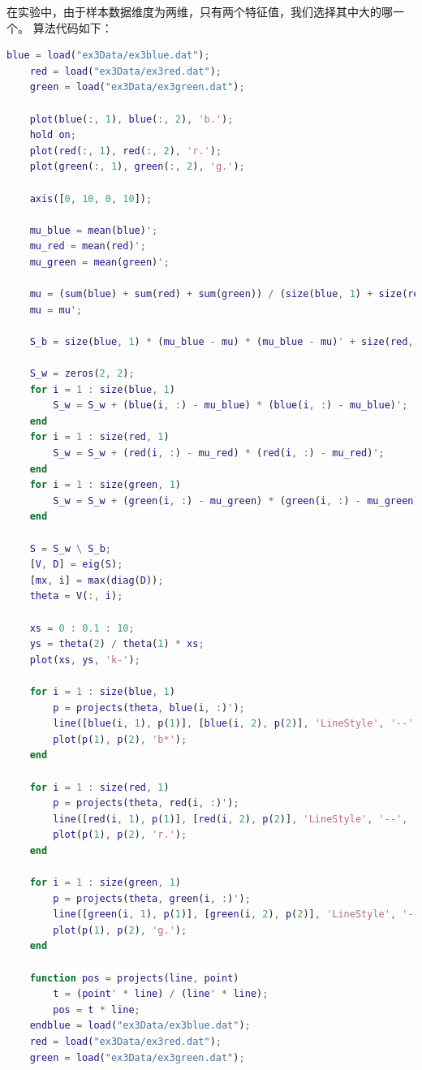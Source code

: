 \documentclass{article}
\begin{document}
在实验中，由于样本数据维度为两维，只有两个特征值，我们选择其中大的哪一个。
算法代码如下：
\begin{lstlisting}[language=matlab]
    blue = load("ex3Data/ex3blue.dat");
    red = load("ex3Data/ex3red.dat");
    green = load("ex3Data/ex3green.dat");

    plot(blue(:, 1), blue(:, 2), 'b.');
    hold on;
    plot(red(:, 1), red(:, 2), 'r.');
    plot(green(:, 1), green(:, 2), 'g.');

    axis([0, 10, 0, 10]);

    mu_blue = mean(blue)';
    mu_red = mean(red)';
    mu_green = mean(green)';

    mu = (sum(blue) + sum(red) + sum(green)) / (size(blue, 1) + size(red, 1) + size(green, 1));
    mu = mu';

    S_b = size(blue, 1) * (mu_blue - mu) * (mu_blue - mu)' + size(red, 1) * (mu_red - mu) * (mu_red - mu)' + size(green, 1) * (mu_green - mu) * (mu_green - mu)';

    S_w = zeros(2, 2);
    for i = 1 : size(blue, 1)
        S_w = S_w + (blue(i, :) - mu_blue) * (blue(i, :) - mu_blue)';
    end
    for i = 1 : size(red, 1)
        S_w = S_w + (red(i, :) - mu_red) * (red(i, :) - mu_red)';
    end
    for i = 1 : size(green, 1)
        S_w = S_w + (green(i, :) - mu_green) * (green(i, :) - mu_green)';
    end

    S = S_w \ S_b;
    [V, D] = eig(S);
    [mx, i] = max(diag(D));
    theta = V(:, i);

    xs = 0 : 0.1 : 10;
    ys = theta(2) / theta(1) * xs;
    plot(xs, ys, 'k-');

    for i = 1 : size(blue, 1)
        p = projects(theta, blue(i, :)');
        line([blue(i, 1), p(1)], [blue(i, 2), p(2)], 'LineStyle', '--', 'Color', 'k', 'LineWidth', 0.5);
        plot(p(1), p(2), 'b*');
    end

    for i = 1 : size(red, 1)
        p = projects(theta, red(i, :)');
        line([red(i, 1), p(1)], [red(i, 2), p(2)], 'LineStyle', '--', 'Color', 'k', 'LineWidth', 0.5);
        plot(p(1), p(2), 'r.');
    end

    for i = 1 : size(green, 1)
        p = projects(theta, green(i, :)');
        line([green(i, 1), p(1)], [green(i, 2), p(2)], 'LineStyle', '--', 'Color', 'k', 'LineWidth', 0.5);
        plot(p(1), p(2), 'g.');
    end

    function pos = projects(line, point)
        t = (point' * line) / (line' * line);
        pos = t * line;
    endblue = load("ex3Data/ex3blue.dat");
    red = load("ex3Data/ex3red.dat");
    green = load("ex3Data/ex3green.dat");


\end{lstlisting}
\end{document}

